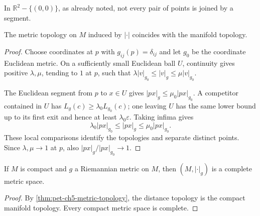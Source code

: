 \begin{example}
  \label{ex:pet-ch5-punctured-plane-no-segment}
  \leanok
  In $\mathbb R^2-\{(0,0)\}$, as already noted, not every pair of points is joined by
  a segment.
\end{example}

\begin{theorem}
  \label{thm:pet-ch5-metric-topology}
  \leanok
  The metric topology on $M$ induced by $|\cdot|$ coincides with the manifold
  topology.
\end{theorem}
\begin{proof}
  \leanok
  \sketch
  Choose coordinates at $p$ with $g_{ij}(p)=\delta_{ij}$ and let $g_0$ be the
  coordinate Euclidean metric.  On a sufficiently small Euclidean ball $U$,
  continuity gives positive $\lambda,\mu$, tending to $1$ at $p$, such that
  $\lambda|v|_{g_0}\le|v|_g\le\mu|v|_{g_0}$.

  The Euclidean segment from $p$ to $x\in U$ gives
  $|px|_g\le\mu_0|px|_{g_0}$.  A competitor contained in $U$ has
  $L_g(c)\ge\lambda_0L_{g_0}(c)$; one leaving $U$ has the same lower bound up to
  its first exit and hence at least $\lambda_0\varepsilon$.  Taking infima gives
  \[
    \lambda_0|px|_{g_0}\le |px|_g\le\mu_0|px|_{g_0}.
  \]
  These local comparisons identify the topologies and separate distinct points.
  Since $\lambda,\mu\to1$ at $p$, also
  $|px|_g/|px|_{g_0}\to1$.
\end{proof}

\begin{corollary}
  \label{cor:pet-ch5-compact-complete-metric}
  \leanok
  If $M$ is compact and $g$ a Riemannian metric on $M$, then $(M,|\cdot|_g)$ is a
  complete metric space.
\end{corollary}
\begin{proof}
  \leanok
  \sketch
  By \cref{thm:pet-ch5-metric-topology}, the distance topology is the compact
  manifold topology.  Every compact metric space is complete.
\end{proof}

